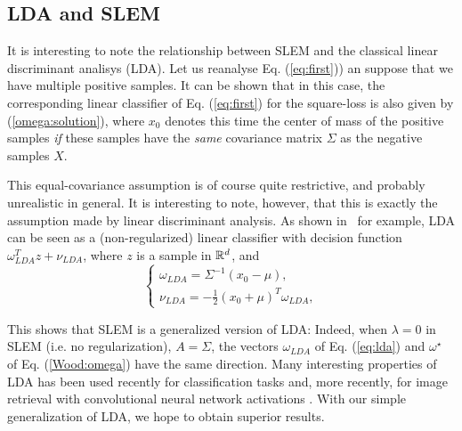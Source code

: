 \subsection{LDA and SLEM}\label{sec:lda}

It is interesting to note the relationship between SLEM and the classical linear discriminant analisys (LDA).
Let us reanalyse Eq. (\ref{eq:first})) an suppose that we have multiple positive samples. It can be shown that in this case, the corresponding linear classifier of Eq. (\ref{eq:first}) for the square-loss is also given by
(\ref{omega:solution}), where $x_0$ denotes this time the center of mass
of the positive samples {\em if} these samples have the {\em same} covariance matrix $\Sigma$ as the negative samples $X$.
 
This equal-covariance assumption is of course quite restrictive, and probably unrealistic in general. It is interesting to note, however, that this is exactly the assumption made by linear discriminant analysis. As shown in~\cite{Hastie2009} for example, LDA can be seen as a (non-regularized) linear classifier with decision function $\omega^T_{LDA} z+ \nu_{LDA}$, where $z$ is a sample in
$\mathbb R^d$, and
\begin{equation}
\left\{\begin{array}{l}
\displaystyle \omega_{LDA}=\Sigma^{-1}(x_0-\mu),\\
\displaystyle \nu_{LDA}=-\frac{1}{2}(x_0+\mu)^T \omega_{LDA},
\end{array}\right.
\label{eq:lda}
\end{equation}
 
This shows that SLEM is a generalized version of LDA: Indeed, when $\lambda=0$ in SLEM (i.e. no regularization), $A = \Sigma$, the vectors $\omega_{LDA}$ of Eq. (\ref{eq:lda}) and $\omega^\star$ of Eq. (\ref{Wood:omega}) have the same direction.
Many interesting properties of LDA has been used recently for classification tasks \cite{GMPD12,HMR12} and, more recently, for image retrieval with convolutional neural network activations \cite{babenko15}.
With our simple generalization of LDA, we hope to obtain superior results.



